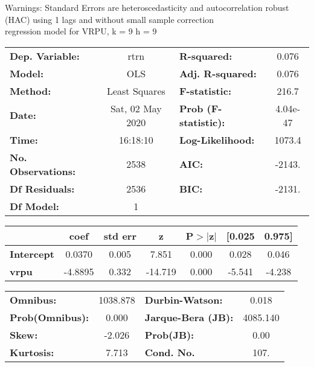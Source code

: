 Warnings: \newline
 [1] Standard Errors are heteroscedasticity and autocorrelation robust (HAC) using 1 lags and without small sample correction\\ 

regression model for VRPU, k = 9 h = 9\begin{center}
\begin{tabular}{lclc}
\toprule
\textbf{Dep. Variable:}    &       rtrn       & \textbf{  R-squared:         } &     0.076   \\
\textbf{Model:}            &       OLS        & \textbf{  Adj. R-squared:    } &     0.076   \\
\textbf{Method:}           &  Least Squares   & \textbf{  F-statistic:       } &     216.7   \\
\textbf{Date:}             & Sat, 02 May 2020 & \textbf{  Prob (F-statistic):} &  4.04e-47   \\
\textbf{Time:}             &     16:18:10     & \textbf{  Log-Likelihood:    } &    1073.4   \\
\textbf{No. Observations:} &        2538      & \textbf{  AIC:               } &    -2143.   \\
\textbf{Df Residuals:}     &        2536      & \textbf{  BIC:               } &    -2131.   \\
\textbf{Df Model:}         &           1      & \textbf{                     } &             \\
\bottomrule
\end{tabular}
\begin{tabular}{lcccccc}
                   & \textbf{coef} & \textbf{std err} & \textbf{z} & \textbf{P$> |$z$|$} & \textbf{[0.025} & \textbf{0.975]}  \\
\midrule
\textbf{Intercept} &       0.0370  &        0.005     &     7.851  &         0.000        &        0.028    &        0.046     \\
\textbf{vrpu}      &      -4.8895  &        0.332     &   -14.719  &         0.000        &       -5.541    &       -4.238     \\
\bottomrule
\end{tabular}
\begin{tabular}{lclc}
\textbf{Omnibus:}       & 1038.878 & \textbf{  Durbin-Watson:     } &    0.018  \\
\textbf{Prob(Omnibus):} &   0.000  & \textbf{  Jarque-Bera (JB):  } & 4085.140  \\
\textbf{Skew:}          &  -2.026  & \textbf{  Prob(JB):          } &     0.00  \\
\textbf{Kurtosis:}      &   7.713  & \textbf{  Cond. No.          } &     107.  \\
\bottomrule
\end{tabular}
\end{center}

